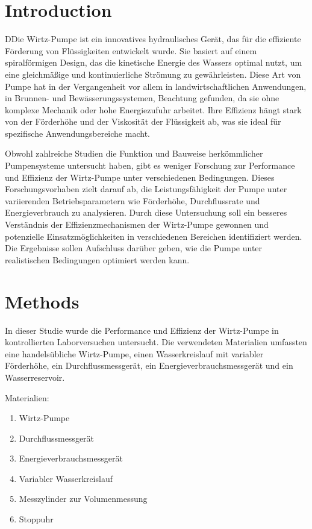\documentclass[12pt]{article}
\begin{document}
\begin{enumerate}
\section{Introduction}
DDie Wirtz-Pumpe ist ein innovatives hydraulisches Gerät, das für die effiziente Förderung von Flüssigkeiten entwickelt wurde. Sie basiert auf einem spiralförmigen Design, das die kinetische Energie des Wassers optimal nutzt, um eine gleichmäßige und kontinuierliche Strömung zu gewährleisten. Diese Art von Pumpe hat in der Vergangenheit vor allem in landwirtschaftlichen Anwendungen, in Brunnen- und Bewässerungssystemen, Beachtung gefunden, da sie ohne komplexe Mechanik oder hohe Energiezufuhr arbeitet. Ihre Effizienz hängt stark von der Förderhöhe und der Viskosität der Flüssigkeit ab, was sie ideal für spezifische Anwendungsbereiche macht.

Obwohl zahlreiche Studien die Funktion und Bauweise herkömmlicher Pumpensysteme untersucht haben, gibt es weniger Forschung zur Performance und Effizienz der Wirtz-Pumpe unter verschiedenen Bedingungen. Dieses Forschungsvorhaben zielt darauf ab, die Leistungsfähigkeit der Pumpe unter variierenden Betriebsparametern wie Förderhöhe, Durchflussrate und Energieverbrauch zu analysieren. Durch diese Untersuchung soll ein besseres Verständnis der Effizienzmechanismen der Wirtz-Pumpe gewonnen und potenzielle Einsatzmöglichkeiten in verschiedenen Bereichen identifiziert werden. Die Ergebnisse sollen Aufschluss darüber geben, wie die Pumpe unter realistischen Bedingungen optimiert werden kann.
\section{Methods}
In dieser Studie wurde die Performance und Effizienz der Wirtz-Pumpe in kontrollierten Laborversuchen untersucht. Die verwendeten Materialien umfassten eine handelsübliche Wirtz-Pumpe, einen Wasserkreislauf mit variabler Förderhöhe, ein Durchflussmessgerät, ein Energieverbrauchsmessgerät und ein Wasserreservoir.

Materialien:
\begin{enumerate}
\item Wirtz-Pumpe
\item Durchflussmessgerät
\item Energieverbrauchsmessgerät
\item Variabler Wasserkreislauf
\item Messzylinder zur Volumenmessung
\item Stoppuhr
\end{enumerate}


\end{enumerate}
\end{document}
